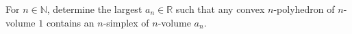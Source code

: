 For $n \in \mathbb{N}$, determine the largest $a_n \in \mathbb{R}$ such that
any convex $n$-polyhedron of $n$-volume $1$ contains an $n$-simplex of $n$-volume $a_n$.
